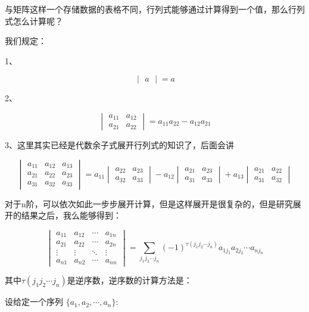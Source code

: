 \documentclass[12.8pt,a4paper,numbering = AMSalpha]{book}
\begin{document}
\vspace{10pt}

与矩阵这样一个存储数据的表格不同，行列式能够通过计算得到一个值，那么行列式怎么计算呢？

我们规定：

1、

\[
\begin{vmatrix}
	a
\end{vmatrix}
=a
\]

2、

\[
\begin{vmatrix}
	a_{11}&a_{12}\\
	a_{21}&a_{22}
\end{vmatrix}
=a_{11}a_{22}-a_{12}a_{21}
\]

3、这里其实已经是代数余子式展开行列式的知识了，后面会讲

\[
\begin{vmatrix}
	a_{11} & a_{12} & a_{13}\\
	a_{21} & a_{22} & a_{23}\\
	a_{31} & a_{32} & a_{33}
\end{vmatrix}
=
a_{11}
\begin{vmatrix}
	a_{22}&a_{23}\\
	a_{32}&a_{33}
\end{vmatrix}
-
a_{12}
\begin{vmatrix}
	a_{21}&a_{23}\\
	a_{31}&a_{33}
\end{vmatrix}
+
a_{13}
\begin{vmatrix}
	a_{21}&a_{22}\\
	a_{31}&a_{32}
\end{vmatrix}
\]

对于n阶，可以依次如此一步步展开计算，但是这样展开是很复杂的，但是研究展开的结果之后，我么能够得到：

\[
\begin{vmatrix}
	a_{11} & a_{12} &\cdots & a_{1n}\\
	a_{21} & a_{22} &\cdots & a_{2n}\\
	\vdots & \vdots &\ddots & \vdots\\
	a_{n1} & a_{n2} &\cdots & a_{nn}
\end{vmatrix}=\sum\limits_{j_1j_2\cdots j_n}(-1)^{\tau(j_1j_2\cdots j_n)}a_{1j_1}a_{2j_2}\cdots a_{nj_n}
\]

其中$\tau(j_1j_2\cdots j_n)$是逆序数，逆序数的计算方法是：

设给定一个序列 $\{a_1,a_2,\cdots,a_n\}$:
\end{document}
